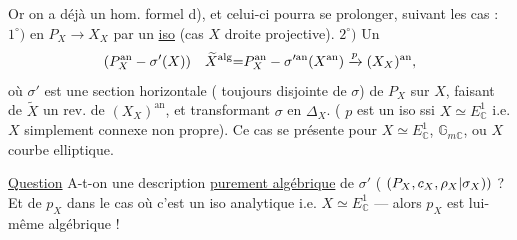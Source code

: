 Or on a déjà un hom. formel d), et celui-ci pourra se prolonger, suivant les cas : $1^\circ)$ en $P_X\longrightarrow X_X$ par un \uline{iso} (cas $X$ droite projective). $2^\circ)$ Un 
\[
{(P_X^{\mathrm{an}}-\sigma'(X))}\quad
{\widetilde X^{\mathrm{alg}}}{=}
P_X^{\mathrm{an}}-\sigma'^{\mathrm{an}}(X^{\mathrm{an}})\xrightarrow{p}(X_X)^{\mathrm{an}},
\]
où $\sigma'$ est une section horizontale ( toujours disjointe de $\sigma$) de $P_X$ sur $X$, faisant de $\widetilde X$ un rev. de $(X_X)^{\mathrm{an}}$, et transformant $\sigma$ en $\Delta_X$. ( $p$ est un iso ssi $X\simeq E^1_{\mathbb C}$ i.e. $X$ simplement connexe non propre). Ce cas se présente pour $X\simeq E^1_{\mathbb C}$, $\mathbb G_{m\mathbb C}$, ou $X$ courbe elliptique.


\uline{Question} A-t-on une description \uline{purement algébrique} de $\sigma'$ ( $(P_X,c_X,{\rho_X|\sigma_X}))$ ? Et de $p_X$ dans le cas où c'est un iso analytique i.e. $X\simeq E^1_{\mathbb C}$ --- alors $p_X$ est lui-même algébrique !


